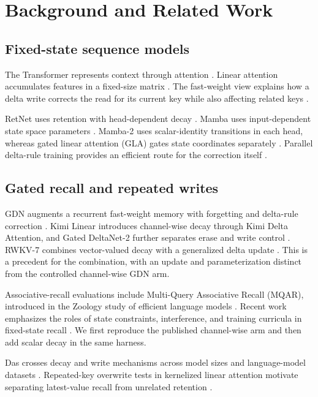 \documentclass[conference]{IEEEtran}
\begin{document}
\section{Background and Related Work}
\subsection{Fixed-state sequence models}
The Transformer represents context through attention \cite{vaswani2017attention}. Linear attention accumulates features in a fixed-size matrix \cite{katharopoulos2020transformers}. The fast-weight view explains how a delta write corrects the read for its current key while also affecting related keys \cite{schlag2021linear}.

RetNet uses retention with head-dependent decay \cite{sun2023retnet}. Mamba uses input-dependent state space parameters \cite{gu2024mamba}. Mamba-2 uses scalar-identity transitions in each head, whereas gated linear attention (GLA) gates state coordinates separately \cite{dao2024transformers,yang2024gla}. Parallel delta-rule training provides an efficient route for the correction itself \cite{yang2024delta}.

\subsection{Gated recall and repeated writes}
GDN augments a recurrent fast-weight memory with forgetting and delta-rule correction \cite{yang2025gdn}. Kimi Linear introduces channel-wise decay through Kimi Delta Attention, and Gated DeltaNet-2 further separates erase and write control \cite{kimi2025,hatamizadeh2026gdn2}. RWKV-7 combines vector-valued decay with a generalized delta update \cite{peng2025rwkv}. This is a precedent for the combination, with an update and parameterization distinct from the controlled channel-wise GDN arm.

Associative-recall evaluations include Multi-Query Associative Recall (MQAR), introduced in the Zoology study of efficient language models \cite{arora2024zoology}. Recent work emphasizes the roles of state constraints, interference, and training curricula in fixed-state recall \cite{boesch2026anatomy}. We first reproduce the published channel-wise arm and then add scalar decay in the same harness.

Das crosses decay and write mechanisms across model sizes and language-model datasets \cite{das2026}. Repeated-key overwrite tests in kernelized linear attention motivate separating latest-value recall from unrelated retention \cite{ghaleb2026kata}.
\end{document}
